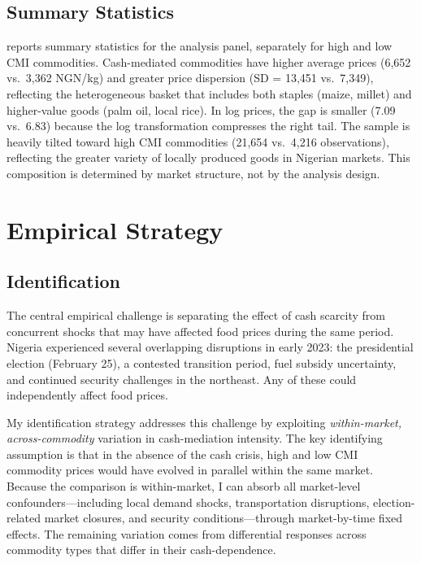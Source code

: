 \documentclass[12pt]{article}
\begin{document}
\subsection{Summary Statistics}

 reports summary statistics for the analysis panel, separately for high and low CMI commodities. Cash-mediated commodities have higher average prices (6,652 vs.\ 3,362 NGN/kg) and greater price dispersion (SD = 13,451 vs.\ 7,349), reflecting the heterogeneous basket that includes both staples (maize, millet) and higher-value goods (palm oil, local rice). In log prices, the gap is smaller (7.09 vs.\ 6.83) because the log transformation compresses the right tail. The sample is heavily tilted toward high CMI commodities (21,654 vs.\ 4,216 observations), reflecting the greater variety of locally produced goods in Nigerian markets. This composition is determined by market structure, not by the analysis design.




\section{Empirical Strategy}
\label{sec:strategy}

\subsection{Identification}

The central empirical challenge is separating the effect of cash scarcity from concurrent shocks that may have affected food prices during the same period. Nigeria experienced several overlapping disruptions in early 2023: the presidential election (February 25), a contested transition period, fuel subsidy uncertainty, and continued security challenges in the northeast. Any of these could independently affect food prices.

My identification strategy addresses this challenge by exploiting \emph{within-market, across-commodity} variation in cash-mediation intensity. The key identifying assumption is that in the absence of the cash crisis, high and low CMI commodity prices would have evolved in parallel within the same market. Because the comparison is within-market, I can absorb all market-level confounders---including local demand shocks, transportation disruptions, election-related market closures, and security conditions---through market-by-time fixed effects. The remaining variation comes from differential responses across commodity types that differ in their cash-dependence.
\end{document}
